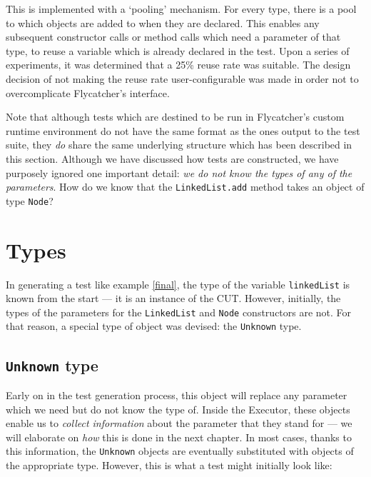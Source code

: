 This is implemented with a `pooling' mechanism. For every type, there is a pool to which objects are added to when they are declared. This enables any subsequent constructor calls or method calls which need a parameter of that type, to reuse a variable which is already declared in the test. Upon a series of experiments, it was determined that a 25\% reuse rate was suitable. The design decision of not making the reuse rate user-configurable was made in order not to overcomplicate \textsf{Flycatcher}'s interface.

Note that although tests which are destined to be run in \textsf{Flycatcher}'s custom runtime environment do not have the same format as the ones output to the test suite, they \emph{do} share the same underlying structure which has been described in this section. Although we have discussed how tests are constructed, we have purposely ignored one important detail: \emph{we do not know the types of any of the parameters}. How do we know that the \texttt{LinkedList.add} method takes an object of type \texttt{Node}?

\section{Types}

In generating a test like example \ref{final}, the type of the variable \texttt{linkedList} is known from the start --- it is an instance of the CUT. However, initially, the types of the parameters for the \texttt{LinkedList} and \texttt{Node} constructors are not. For that reason, a special type of object was devised: the \texttt{Unknown} type.

\subsection{\texttt{Unknown} type}

Early on in the test generation process, this object will replace any parameter which we need but do not know the type of. Inside the \textsf{Executor}, these objects enable us to \emph{collect information} about the parameter that they stand for --- we will elaborate on \emph{how} this is done in the next chapter. In most cases, thanks to this information, the \texttt{Unknown} objects are eventually substituted with objects of the appropriate type. However, this is what a test might initially look like:

